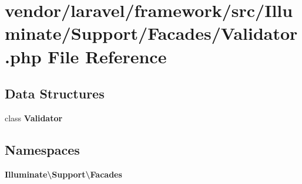 \section{vendor/laravel/framework/src/\+Illuminate/\+Support/\+Facades/\+Validator.php File Reference}
\label{_support_2_facades_2_validator_8php}
\subsection*{Data Structures}
\begin{DoxyCompactItemize}
\item 
class {\bf Validator}
\end{DoxyCompactItemize}
\subsection*{Namespaces}
\begin{DoxyCompactItemize}
\item 
 {\bf Illuminate\textbackslash{}\+Support\textbackslash{}\+Facades}
\end{DoxyCompactItemize}
